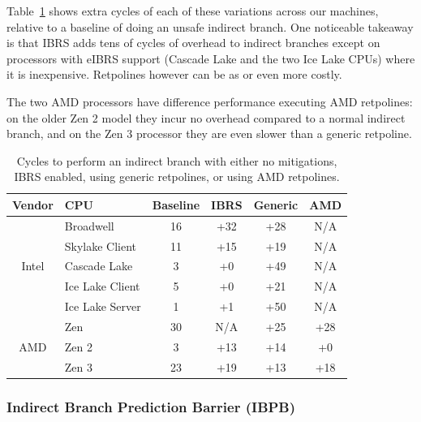 Table~\ref{table:retpoline} shows extra cycles of each of these variations across our machines, relative to a baseline of doing an unsafe indirect branch.
One noticeable takeaway is that IBRS adds tens of cycles of overhead to indirect branches except on processors with eIBRS support (Cascade Lake and the two Ice Lake CPUs) where it is inexpensive.
Retpolines however can be as or even more costly.

The two AMD processors have difference performance executing AMD
retpolines: on the older Zen 2 model they incur no overhead compared to a
normal indirect branch, and on the Zen 3 processor they are even
slower than a generic retpoline.





\begin{table}[h]
\begin{center}
\begin{tabular}{ clcccc }
  \textbf{Vendor} & \textbf{CPU} & \textbf{Baseline} & \textbf{IBRS} & \textbf{Generic} & \textbf{AMD} \\ \hline
  \multirow{5}{*}{Intel} & Broadwell           & 16 & +32 & +28 & \tiny{N/A} \\
                         & Skylake Client      & 11 & +15 & +19 & \tiny{N/A} \\
                         & Cascade Lake        & 3 & +0 & +49 & \tiny{N/A} \\
                         & Ice Lake Client     & 5 & +0 & +21 & \tiny{N/A} \\
                         & Ice Lake Server     & 1 & +1 & +50 & \tiny{N/A} \\ \hline
  \multirow{3}{*}{AMD}   & Zen                 & 30 & \tiny{N/A} & +25 & +28 \\
                         & Zen 2               & 3 & +13 & +14 & +0 \\
                         & Zen 3               & 23 & +19 & +13 & +18 \\ \hline
\end{tabular}
\end{center}
\caption{Cycles to perform an indirect branch with either no mitigations, IBRS enabled, using generic retpolines, or using AMD retpolines.}
\label{table:retpoline}
\end{table}

\subsubsection{Indirect Branch Prediction Barrier (IBPB)}


